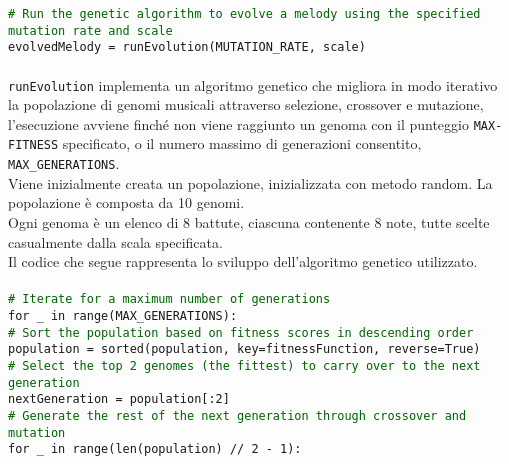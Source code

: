 \documentclass[a4paper,12pt]{report}
\begin{document}
\texttt{\small\textcolor{darkgreen}{\# Run the genetic algorithm to evolve a melody using the specified mutation rate and scale}} \\
\texttt{\small evolvedMelody = runEvolution(MUTATION\_RATE, scale)} \\
\\
\texttt{runEvolution} implementa un algoritmo genetico che migliora in modo iterativo la popolazione di genomi musicali attraverso selezione, crossover e mutazione, l'esecuzione avviene finché non viene raggiunto un genoma con il punteggio \texttt{MAX-FITNESS} specificato, o il numero massimo di generazioni consentito, \texttt{MAX\_GENERATIONS}. \\
Viene inizialmente creata un popolazione, inizializzata con metodo random. La popolazione è composta da 10 genomi. \\
Ogni genoma è un elenco di 8 battute, ciascuna contenente 8 note, tutte scelte casualmente dalla scala specificata. \\
Il codice che segue rappresenta lo sviluppo dell'algoritmo genetico utilizzato. \\
\\
\texttt{\small\textcolor{darkgreen}{\# Iterate for a maximum number of generations}} \\
\texttt{\small for \_ in range(MAX\_GENERATIONS):} \\

\indent        \texttt{\small\textcolor{darkgreen}{\# Sort the population based on fitness scores in descending order}} \\
\indent        \texttt{\small population = sorted(population, key=fitnessFunction, reverse=True)} \\
        
\indent        \texttt{\small\textcolor{darkgreen}{\# Select the top 2 genomes (the fittest) to carry over to the next generation}} \\
\indent        \texttt{\small nextGeneration = population[:2]} \\

\indent        \texttt{\small\textcolor{darkgreen}{\# Generate the rest of the next generation through crossover and mutation}} \\
\indent        \texttt{\small for \_ in range(len(population) // 2 - 1):} \\
\end{document}
